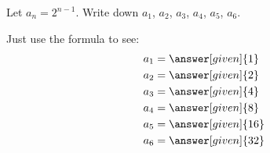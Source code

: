 \documentclass{ximera}
\begin{document}
\begin{example}
  Let $a_n = 2^{n-1}$.  Write down $a_1$, $a_2$, $a_3$, $a_4$, $a_5$,
  $a_6$.
  \begin{explanation}
    Just use the formula to see:
    \begin{align*}
      a_1 &= \answer[given]{1}\\
      a_2 &= \answer[given]{2}\\
      a_3 &= \answer[given]{4}\\
      a_4 &= \answer[given]{8}\\
      a_5 &= \answer[given]{16}\\
      a_6 &= \answer[given]{32}
    \end{align*}
  \end{explanation}
\end{example}
\end{document}
